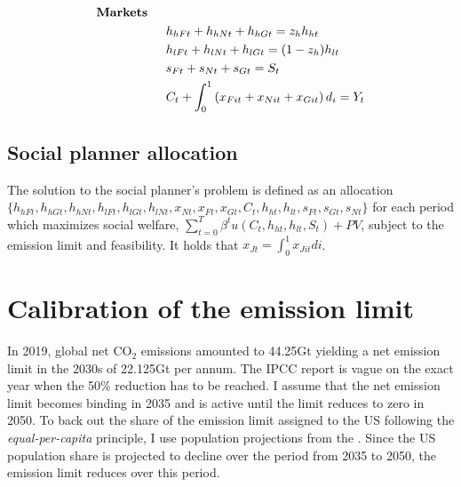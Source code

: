 \begin{align}
\text{\textbf{Markets}}\ \hspace{4mm}&\nonumber\\
&h_{hFt}+h_{hNt}+h_{hGt}=z_{h} h_{ht}\nonumber\\
&h_{lFt}+h_{lNt}+h_{lGt}=(1-z_h) h_{lt}\nonumber\\
&s_{Ft}+s_{Nt}+s_{Gt}=S_{t}\nonumber\\
&C_{t}+\int_{0}^{1} \left(x_{Fit}+x_{Nit}+x_{Git}\right)d_i=Y_t\nonumber
\end{align}
\vspace{-10mm}
\subsection{Social planner allocation}\label{app:sp_prob} The solution to the social planner's problem is defined as an allocation \\ $\{h_{hFt}, h_{hGt}, h_{hNt}, h_{lFt}, h_{lGt}, h_{lNt}, x_{Nt}, x_{Ft}, x_{Gt}, C_t,  h_{ht}, h_{lt}, s_{Ft}, s_{Gt}, s_{Nt} \}$ for each period which maximizes social welfare, $\sum_{t=0}^{T}\beta^t u(C_{t}, h_{ht}, h_{lt}, S_{t})+ PV$, subject to the emission limit and feasibility. 
It holds that $x_{Jt}=\int_{0}^{1}x_{Jit}di$.


\section{Calibration of the emission limit}\label{app:calib}
In 2019, global net CO$_2$ emissions amounted to 44.25Gt \citep[compare Figure SPM1.a p.11 in ][]{IPCCSPM} yielding a net emission limit in the 2030s of 22.125Gt per annum. The IPCC report is vague on the exact year when the 50\% reduction has to be reached. I assume that the net emission limit becomes binding in 2035 and is active until the limit reduces to zero in 2050. 
To back out the share of the emission limit assigned to the US following the \textit{equal-per-capita} principle, I use population projections from the \cite{UNPOP}. %
Since the US population share is projected to decline over the period from 2035 to 2050, the emission limit reduces over this period. 

